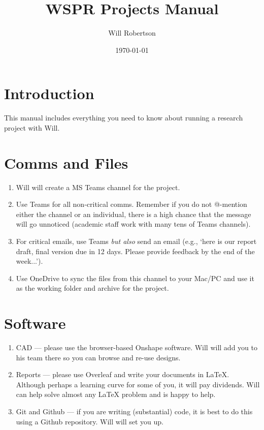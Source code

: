 \documentclass[11pt,a5paper]{article}
\title{WSPR Projects Manual}
\author{Will Robertson}
\date{\today}
\begin{document}
\maketitle
\tableofcontents

\section{Introduction}

This manual includes everything you need to know about running a research project with Will.

\section{Comms and Files}

\begin{enumerate}
\item Will will create a MS Teams channel for the project.

\item Use Teams for all non-critical comms. Remember if you do not @-mention either the channel or an individual, there is a high chance that the message will go unnoticed (academic staff work with many tens of Teams channels).

\item For critical emails, use Teams \emph{but also} send an email (e.g., `here is our report draft, final version due in 12 days. Please provide feedback by the end of the week...').

\item Use OneDrive to sync the files from this channel to your Mac/PC and use it as the working folder and archive for the project.
\end{enumerate}

\section{Software}

\begin{enumerate}[resume]
\item CAD --- please use the browser-based Onshape software. Will will add you to his team there so you can browse and re-use designs.
\item Reports --- please use Overleaf and write your documents in LaTeX. Although perhaps a learning curve for some of you, it will pay dividends. Will can help solve almost any LaTeX problem and is happy to help.
\item Git and Github --- if you are writing (substantial) code, it is best to do this using a Github repository. Will will set you up.
\end{enumerate}
\end{document}
